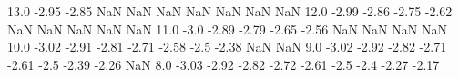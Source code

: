 13.0  -2.95    -2.85    NaN NaN NaN NaN NaN NaN NaN
12.0  -2.99    -2.86    -2.75    -2.62    NaN NaN NaN NaN NaN
11.0  -3.0    -2.89    -2.79    -2.65    -2.56    NaN NaN NaN NaN
10.0  -3.02    -2.91    -2.81    -2.71    -2.58    -2.5    -2.38    NaN NaN
9.0  -3.02    -2.92    -2.82    -2.71    -2.61    -2.5    -2.39    -2.26    NaN
8.0  -3.03    -2.92    -2.82    -2.72    -2.61    -2.5    -2.4    -2.27    -2.17 
